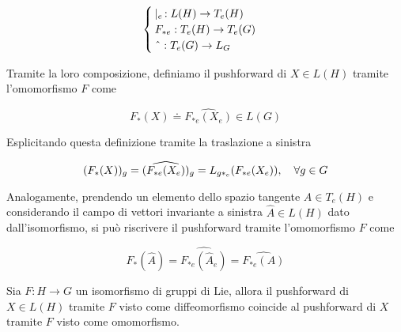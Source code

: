 \begin{equation}
	\begin{cases}
		\mid_{e} \, : L(H) \to T_{e}(H)\\
		F_{*e} : T_{e}(H) \to T_{e}(G)\\
		\; \hat{} \; : T_{e}(G) \to L_{G}
	\end{cases}
\end{equation}


Tramite la loro composizione, definiamo il pushforward di $ X \in L(H) $ tramite l'omomorfismo $ F $ come

\begin{equation}
	F_{*}(X) \doteq \widehat{ F_{*e}(X_{e}) } \in L(G)
\end{equation}

Esplicitando questa definizione tramite la traslazione a sinistra

\begin{equation}
	(F_{*}(X))_{g} = (\widehat{ F_{*e}(X_{e}) })_{g} = L_{g*_{e}} (F_{*e}(X_{e})) \qcomma \forall g \in G
\end{equation}

Analogamente, prendendo un elemento dello spazio tangente $ A \in T_{e}(H) $ e considerando il campo di vettori invariante a sinistra $ \hat{A} \in L(H) $ dato dall'isomorfismo, si può riscrivere il pushforward tramite l'omomorfismo $ F $ come

\begin{equation}
	F_{*} (\hat{A}) = \widehat{ F_{*e} (\hat{A}_{e}) } = \widehat{ F_{*e} (A) }
\end{equation}

\begin{definition}[1]
	Sia $ F : H \to G $ un isomorfismo di gruppi di Lie, allora il pushforward di $ X \in L(H) $ tramite $ F $ visto come diffeomorfismo coincide al pushforward di $ X $ tramite $ F $ visto come omomorfismo.
\end{definition}

